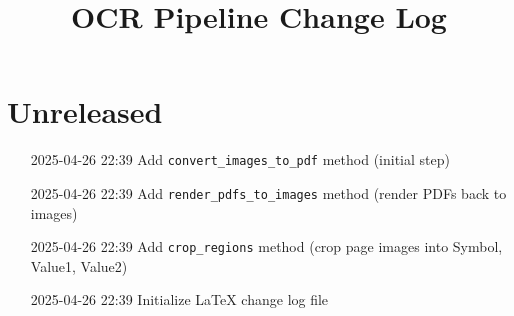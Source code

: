 \documentclass{article}
\title{OCR Pipeline Change Log}
\date{}
\begin{document}
\maketitle

\section*{Unreleased}
\begin{itemize}
  \item[2025-04-26 22:39] Add \texttt{convert\_images\_to\_pdf} method (initial step)  %
  \item[2025-04-26 22:39] Add \texttt{render\_pdfs\_to\_images} method (render PDFs back to images)  %
  \item[2025-04-26 22:39] Add \texttt{crop\_regions} method (crop page images into Symbol, Value1, Value2)  %
  \item[2025-04-26 22:39] Initialize LaTeX change log file  %
\end{itemize}
\end{document}

